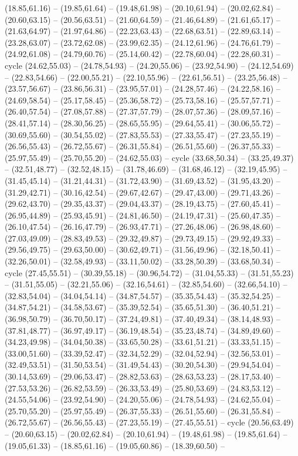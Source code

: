 {(18.85,61.16) -- (19.85,61.64) -- (19.48,61.98) -- (20.10,61.94) -- (20.02,62.84) -- (20.60,63.15) -- (20.56,63.51) -- (21.60,64.59) -- (21.46,64.89) -- (21.61,65.17) -- (21.63,64.97) -- (21.97,64.86) -- (22.23,63.43) -- (22.68,63.51) -- (22.89,63.14) -- (23.28,63.07) -- (23.72,62.08) -- (23.99,62.35) -- (24.12,61.96) -- (24.76,61.79) -- (24.92,61.08) -- (24.79,60.76) -- (25.14,60.42) -- (22.78,60.04) -- (22.28,60.31) -- cycle (24.62,55.03) -- (24.78,54.93) -- (24.20,55.06) -- (23.92,54.90) -- (24.12,54.69) -- (22.83,54.66) -- (22.00,55.21) -- (22.10,55.96) -- (22.61,56.51) -- (23.25,56.48) -- (23.57,56.67) -- (23.86,56.31) -- (23.95,57.01) -- (24.28,57.46) -- (24.22,58.16) -- (24.69,58.54) -- (25.17,58.45) -- (25.36,58.72) -- (25.73,58.16) -- (25.57,57.71) -- (26.40,57.54) -- (27.08,57.88) -- (27.37,57.79) -- (28.07,57.36) -- (28.09,57.16) -- (28.41,57.14) -- (28.30,56.25) -- (28.65,55.95) -- (29.64,55.41) -- (30.06,55.72) -- (30.69,55.60) -- (30.54,55.02) -- (27.83,55.53) -- (27.33,55.47) -- (27.23,55.19) -- (26.56,55.43) -- (26.72,55.67) -- (26.31,55.84) -- (26.51,55.60) -- (26.37,55.33) -- (25.97,55.49) -- (25.70,55.20) -- (24.62,55.03) -- cycle (33.68,50.34) -- (33.25,49.37) -- (32.51,48.77) -- (32.52,48.15) -- (31.78,46.69) -- (31.68,46.12) -- (32.19,45.95) -- (31.45,45.14) -- (31.21,44.31) -- (31.72,43.90) -- (31.69,43.52) -- (31.95,43.20) -- (31.29,42.71) -- (30.16,42.54) -- (29.67,42.67) -- (29.47,43.00) -- (29.71,43.26) -- (29.62,43.70) -- (29.35,43.37) -- (29.04,43.37) -- (28.19,43.75) -- (27.60,45.41) -- (26.95,44.89) -- (25.93,45.91) -- (24.81,46.50) -- (24.19,47.31) -- (25.60,47.35) -- (26.10,47.54) -- (26.16,47.79) -- (26.93,47.71) -- (27.26,48.06) -- (26.98,48.60) -- (27.03,49.09) -- (28.83,49.53) -- (29.32,49.87) -- (29.73,49.15) -- (29.92,49.33) -- (29.56,49.75) -- (29.63,50.00) -- (30.62,49.71) -- (31.56,49.96) -- (32.18,50.41) -- (32.26,50.01) -- (32.58,49.93) -- (33.11,50.02) -- (33.28,50.39) -- (33.68,50.34) -- cycle (27.45,55.51) -- (30.39,55.18) -- (30.96,54.72) -- (31.04,55.33) -- (31.51,55.23) -- (31.51,55.05) -- (32.21,55.06) -- (32.16,54.61) -- (32.85,54.60) -- (32.66,54.10) -- (32.83,54.04) -- (34.04,54.14) -- (34.87,54.57) -- (35.35,54.43) -- (35.32,54.25) -- (34.87,54.21) -- (34.58,53.67) -- (35.39,52.54) -- (35.65,51.30) -- (36.40,51.21) -- (36.98,50.79) -- (36.70,50.17) -- (37.24,49.81) -- (37.40,49.34) -- (38.14,48.93) -- (37.81,48.77) -- (36.97,49.17) -- (36.19,48.54) -- (35.23,48.74) -- (34.89,49.60) -- (34.23,49.98) -- (34.04,50.38) -- (33.65,50.28) -- (33.61,51.21) -- (33.33,51.15) -- (33.00,51.60) -- (33.39,52.47) -- (32.34,52.29) -- (32.04,52.94) -- (32.56,53.01) -- (32.49,53.51) -- (31.50,53.54) -- (31.49,54.43) -- (30.20,54.30) -- (29.94,54.04) -- (30.14,53.69) -- (29.06,53.47) -- (28.82,53.63) -- (28.63,53.23) -- (28.17,53.40) -- (27.53,53.26) -- (26.82,53.59) -- (26.33,53.49) -- (25.80,53.69) -- (24.83,53.12) -- (24.55,54.06) -- (23.92,54.90) -- (24.20,55.06) -- (24.78,54.93) -- (24.62,55.04) -- (25.70,55.20) -- (25.97,55.49) -- (26.37,55.33) -- (26.51,55.60) -- (26.31,55.84) -- (26.72,55.67) -- (26.56,55.43) -- (27.23,55.19) -- (27.45,55.51) -- cycle (20.56,63.49) -- (20.60,63.15) -- (20.02,62.84) -- (20.10,61.94) -- (19.48,61.98) -- (19.85,61.64) -- (19.05,61.33) -- (18.85,61.16) -- (19.05,60.86) -- (18.39,60.50) -- }
